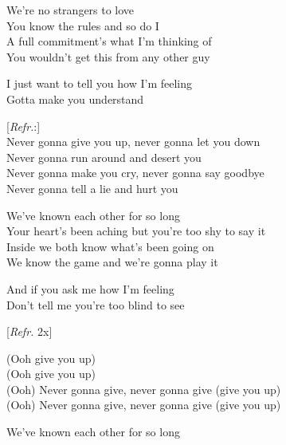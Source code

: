 \vspace{10pt}
We're no strangers to love\\
You know the rules and so do I\\
A full commitment's what I'm thinking of\\
You wouldn't get this from any other guy\par
\vspace{10pt}
I just want to tell you how I'm feeling\\
Gotta make you understand\par
\vspace{10pt}
{\footnotesize[\textit{Refr.}:]}\\
Never gonna give you up, never gonna let you down\\
Never gonna run around and desert you\\
Never gonna make you cry, never gonna say goodbye\\
Never gonna tell a lie and hurt you\par
\vspace{10pt}
We've known each other for so long\\
Your heart's been aching but you're too shy to say it\\
Inside we both know what's been going on\\
We know the game and we're gonna play it\par
\vspace{10pt}
And if you ask me how I'm feeling \\
Don't tell me you're too blind to see\par
\vspace{10pt}
{\footnotesize[\textit{Refr.} 2x]}\par%
\vspace{10pt}
(Ooh give you up)\\
(Ooh give you up)\\
(Ooh) Never gonna give, never gonna give (give you up)\\
(Ooh) Never gonna give, never gonna give (give you up)\par
\newpage
We've known each other for so long\\
